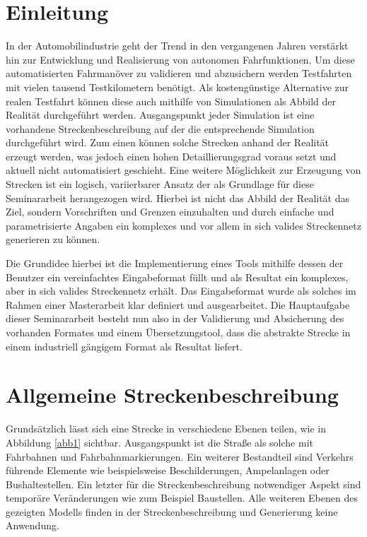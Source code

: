 \thispagestyle{ika}

\chapter{Einleitung}

In der Automobilindustrie geht der Trend in den vergangenen Jahren verstärkt hin zur Entwicklung und Realisierung von autonomen Fahrfunktionen. Um diese automatisierten Fahrmanöver zu validieren und abzusichern werden Testfahrten mit vielen tausend Testkilometern benötigt. Als kostengünstige Alternative zur realen Testfahrt können diese auch mithilfe von Simulationen als Abbild der Realität durchgeführt werden. Ausgangspunkt jeder Simulation ist eine vorhandene Streckenbeschreibung auf der die entsprechende Simulation durchgeführt wird. Zum einen können solche Strecken anhand der Realität erzeugt werden, was jedoch einen hohen Detaillierungsgrad voraus setzt und aktuell nicht automatisiert geschieht. Eine weitere Möglichkeit zur Erzeugung von Strecken ist ein logisch, variierbarer Ansatz der als Grundlage für diese Seminararbeit herangezogen wird. Hierbei ist nicht das Abbild der Realität das Ziel, sondern Vorschriften und Grenzen einzuhalten und durch einfache und parametrisierte Angaben ein komplexes und vor allem in sich valides Streckennetz generieren zu können.

Die Grundidee hierbei ist die Implementierung eines Tools mithilfe dessen der Benutzer ein vereinfachtes Eingabeformat füllt und als Resultat ein komplexes, aber in sich valides Streckennetz erhält. Das Eingabeformat wurde als solches im Rahmen einer Masterarbeit klar definiert und ausgearbeitet. Die Hauptaufgabe dieser Seminararbeit besteht nun also in der Validierung und Absicherung des vorhanden Formates und einem Übersetzungstool, dass die abstrakte Strecke in einem industriell gängigem Format als Resultat liefert.

\chapter{Allgemeine Streckenbeschreibung}

Grundsätzlich lässt sich eine Strecke in verschiedene Ebenen teilen, wie in Abbildung \ref{abb1} sichtbar. Ausgangspunkt ist die Straße als solche mit Fahrbahnen und Fahrbahnmarkierungen. Ein weiterer Bestandteil sind Verkehrs führende Elemente wie beispielsweise Beschilderungen, Ampelanlagen oder Bushaltestellen. Ein letzter für die Streckenbeschreibung notwendiger Aspekt sind temporäre Veränderungen wie zum Beispiel Baustellen. Alle weiteren Ebenen des gezeigten Modells finden in der Streckenbeschreibung und Generierung keine Anwendung.

